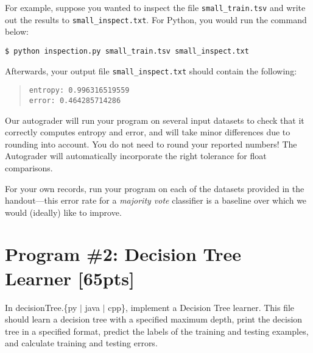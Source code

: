 \documentclass[11pt,addpoints,answers]{exam}
\begin{document}
For example, suppose you wanted to inspect the file \lstinline{small_train.tsv} and write out the results to \lstinline{small_inspect.txt}. For Python, you would run the command below:
%
\begin{lstlisting}[language=Shell]
$ python inspection.py small_train.tsv small_inspect.txt
\end{lstlisting}
%
Afterwards, your output file \lstinline{small_inspect.txt} should contain the following:
%
\begin{quote}
\begin{verbatim}
entropy: 0.996316519559
error: 0.464285714286
\end{verbatim}
\end{quote}
%
Our autograder will run your program on several input datasets to check that it correctly computes entropy and error, and will take minor differences due to rounding into account. You do not need to round your reported numbers! The Autograder will automatically incorporate the right tolerance for float comparisons.

\begin{notebox}
For your own records, run your program on each of the datasets provided in the handout---this error rate for a \emph{majority vote} classifier is a baseline over which we would (ideally) like to improve.
\end{notebox}

\newpage
\section{Program \#2: Decision Tree Learner [65pts]}
\label{sec:decisiontree}

In decisionTree.\{py $\mid$ java $\mid$ cpp\}, implement a Decision Tree learner. This file should learn a decision tree with a specified maximum depth, print the decision tree in a specified format, predict the labels of the training and testing examples, and calculate training and testing errors.
\end{document}
